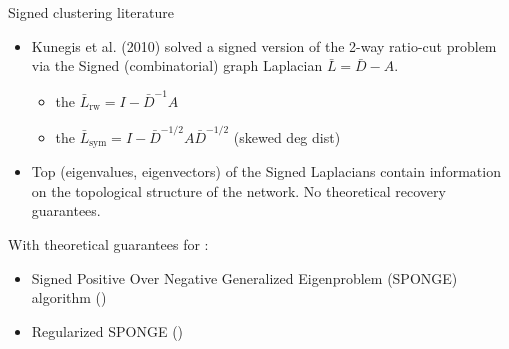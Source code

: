 \documentclass[dvipsnames,mathserif]{beamer}
\newcommand\mypv{\vfill \ifthenelse{\boolean{withPause}}{ \pause }{}}
\begin{document}
\begin{frame}{Signed clustering literature}

\vfill


\begin{itemize}
\item Kunegis et al. (2010)  solved a signed version of the 2-way ratio-cut problem  via the Signed (combinatorial) graph Laplacian $ \bar{L} = \bar{D} - A$.   

\begin{itemize}   
\item the 
$ \bar{L}_{\text{rw}} = I - \bar{D}^{-1} A $ 


\item  the  
$  \bar{L}_{\text{sym}} = I - \bar{D}^{-1/2} A \bar{D}^{-1/2} $ 
(skewed deg dist)
\end{itemize}

\item  Top (eigenvalues, eigenvectors) of the Signed Laplacians contain information on  the topological structure of the network. No theoretical recovery guarantees. 
\end{itemize}

\mypv  


With theoretical guarantees for :
\begin{itemize}
    \item Signed Positive Over Negative Generalized Eigenproblem (SPONGE) algorithm (\cite{cucuringuSPONGE})
    
    \item Regularized SPONGE  (\cite{cucuringuSPONGE})
\end{itemize}

\end{frame}
\end{document}

